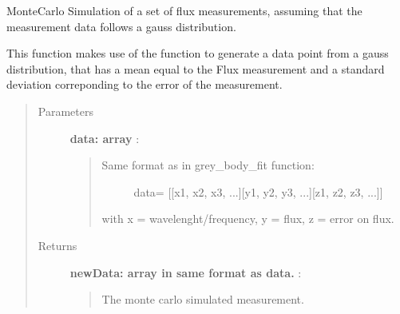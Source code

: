 \documentclass[a4paper,10pt,english]{sphinxmanual}
\begin{document}

\begin{fulllineitems}
\label{functions:astrolyze.functions.astro_functions.generate_monte_carlo_data_sed}
MonteCarlo Simulation of a set of flux measurements, assuming that the
measurement data follows a gauss distribution.

This function makes use of the  function to generate a
data point from a gauss distribution, that has a mean equal to the Flux
measurement and a standard deviation correponding to the error of the
measurement.
\begin{quote}\begin{description}
\item[{Parameters }] \leavevmode
\textbf{data: array} :
\begin{quote}
\begin{description}
\item[{Same format as in grey\_body\_fit function:}] \leavevmode
data= {[}{[}x1, x2, x3, ...{]}{[}y1, y2, y3, ...{]}{[}z1, z2, z3, ...{]}{]}

\end{description}

with x = wavelenght/frequency, y = flux, z = error on flux.
\end{quote}

\item[{Returns }] \leavevmode
\textbf{newData: array in same format as data.} :
\begin{quote}

The monte carlo simulated measurement.
\end{quote}

\end{description}\end{quote}







\end{fulllineitems}

\end{document}
